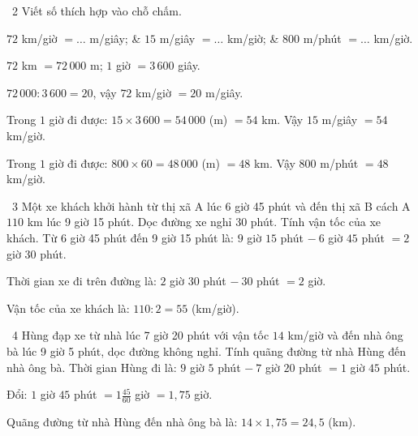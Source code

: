 \begin{exbox}{\ExWord\ 2}
Viết số thích hợp vào chỗ chấm.
\begin{cols3}
 $72$ km/giờ $=\dots$ m/giây; &  $15$ m/giây $=\dots$ km/giờ; &  $800$ m/phút $=\dots$ km/giờ.
\end{cols3}
\guide
{} $72$ km $=72\,000$ m; $1$ giờ $=3\,600$ giây.\par $72\,000:3\,600=20$, vậy $72$ km/giờ $=20$ m/giây.\par
{} Trong $1$ giờ đi được: $15\times3\,600=54\,000$ (m) $=54$ km. Vậy $15$ m/giây $=54$ km/giờ.\par
{} Trong $1$ giờ đi được: $800\times60=48\,000$ (m) $=48$ km. Vậy $800$ m/phút $=48$ km/giờ.
\end{exbox}
\gap
\begin{exbox}{\ExWord\ 3}
Một xe khách khởi hành từ thị xã A lúc 6 giờ 45 phút và đến thị xã B cách A $110$ km lúc 9 giờ 15 phút. Dọc đường xe nghỉ $30$ phút. Tính vận tốc của xe khách.
\guide
Từ 6 giờ 45 phút đến 9 giờ 15 phút là: $9$ giờ $15$ phút $-\ 6$ giờ $45$ phút $=2$ giờ $30$ phút.\par
Thời gian xe đi trên đường là: $2$ giờ $30$ phút $-\ 30$ phút $=2$ giờ.\par
Vận tốc của xe khách là: $110:2=55$ (km/giờ).
\end{exbox}
\gap
\begin{exbox}{\ExWord\ 4}
Hùng đạp xe từ nhà lúc 7 giờ 20 phút với vận tốc $14$ km/giờ và đến nhà ông bà lúc 9 giờ 5 phút, dọc đường không nghỉ. Tính quãng đường từ nhà Hùng đến nhà ông bà.
\guide
Thời gian Hùng đi là: $9$ giờ $5$ phút $-\ 7$ giờ $20$ phút $=1$ giờ $45$ phút.\par
Đổi: $1$ giờ $45$ phút $=1\frac{45}{60}$ giờ $=1{,}75$ giờ.\par
Quãng đường từ nhà Hùng đến nhà ông bà là: $14\times1{,}75=24{,}5$ (km).
\end{exbox}
\gap

